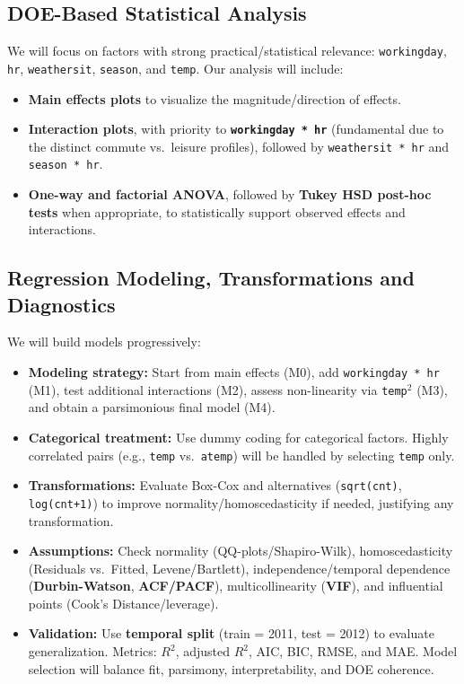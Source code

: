 \documentclass[12pt]{article}
\begin{document}
\subsection{DOE-Based Statistical Analysis}
We will focus on factors with strong practical/statistical relevance: \texttt{workingday}, \texttt{hr}, \texttt{weathersit}, \texttt{season}, and \texttt{temp}. Our analysis will include:
\begin{itemize}
\item \textbf{Main effects plots} to visualize the magnitude/direction of effects.
\item \textbf{Interaction plots}, with priority to \textbf{\texttt{workingday * hr}} (fundamental due to the distinct commute vs.\ leisure profiles), followed by \texttt{weathersit * hr} and \texttt{season * hr}.
\item \textbf{One-way and factorial ANOVA}, followed by \textbf{Tukey HSD post-hoc tests} when appropriate, to statistically support observed effects and interactions.
\end{itemize}

\subsection{Regression Modeling, Transformations and Diagnostics}
We will build models progressively:
\begin{itemize}
\item \textbf{Modeling strategy:} Start from main effects (M0), add \texttt{workingday * hr} (M1), test additional interactions (M2), assess non-linearity via \texttt{temp$^2$} (M3), and obtain a parsimonious final model (M4).
\item \textbf{Categorical treatment:} Use dummy coding for categorical factors. Highly correlated pairs (e.g., \texttt{temp} vs.\ \texttt{atemp}) will be handled by selecting \texttt{temp} only.
\item \textbf{Transformations:} Evaluate Box-Cox and alternatives (\texttt{sqrt(cnt)}, \texttt{log(cnt+1)}) to improve normality/homoscedasticity if needed, justifying any transformation.
\item \textbf{Assumptions:} Check normality (QQ-plots/Shapiro-Wilk), homoscedasticity (Residuals vs.\ Fitted, Levene/Bartlett), independence/temporal dependence (\textbf{Durbin-Watson}, \textbf{ACF/PACF}), multicollinearity (\textbf{VIF}), and influential points (Cook's Distance/leverage).
\item \textbf{Validation:} Use \textbf{temporal split} (train = 2011, test = 2012) to evaluate generalization. Metrics: $R^2$, adjusted $R^2$, AIC, BIC, RMSE, and MAE. Model selection will balance fit, parsimony, interpretability, and DOE coherence.
\end{itemize}
\end{document}
